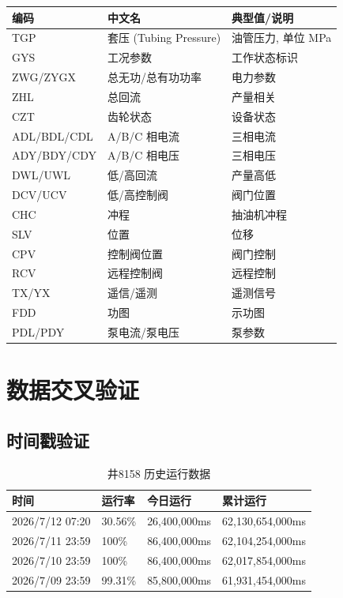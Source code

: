 \documentclass[12pt,a4paper]{ctexart}
\begin{document}
\begin{longtable}{p{2.5cm}p{5cm}p{6cm}}
\toprule
\textbf{编码} & \textbf{中文名} & \textbf{典型值/说明} \\
\midrule
TGP & 套压 (Tubing Pressure) & 油管压力, 单位 MPa \\
GYS & 工况参数 & 工作状态标识 \\
ZWG/ZYGX & 总无功/总有功功率 & 电力参数 \\
ZHL & 总回流 & 产量相关 \\
CZT & 齿轮状态 & 设备状态 \\
ADL/BDL/CDL & A/B/C 相电流 & 三相电流 \\
ADY/BDY/CDY & A/B/C 相电压 & 三相电压 \\
DWL/UWL & 低/高回流 & 产量高低 \\
DCV/UCV & 低/高控制阀 & 阀门位置 \\
CHC & 冲程 & 抽油机冲程 \\
SLV & 位置 & 位移 \\
CPV & 控制阀位置 & 阀门控制 \\
RCV & 远程控制阀 & 远程控制 \\
TX/YX & 遥信/遥测 & 遥测信号 \\
FDD & 功图 & 示功图 \\
PDL/PDY & 泵电流/泵电压 & 泵参数 \\
\bottomrule
\end{longtable}

\section{数据交叉验证}

\subsection{时间戳验证}

\begin{table}[H]\centering
\caption{井8158 历史运行数据}
\begin{tabular}{p{3cm}p{3cm}p{3cm}p{3cm}}
\toprule
\textbf{时间} & \textbf{运行率} & \textbf{今日运行} & \textbf{累计运行} \\
\midrule
2026/7/12 07:20 & 30.56\% & 26,400,000ms & 62,130,654,000ms \\
2026/7/11 23:59 & 100\% & 86,400,000ms & 62,104,254,000ms \\
2026/7/10 23:59 & 100\% & 86,400,000ms & 62,017,854,000ms \\
2026/7/09 23:59 & 99.31\% & 85,800,000ms & 61,931,454,000ms \\
\bottomrule
\end{tabular}
\end{table}
\end{document}

